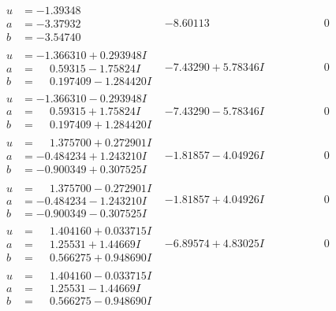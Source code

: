 \documentclass[1p]{elsarticle_modified}
\theoremstyle{definition}
\begin{document}
$$\begin{array}{c|c|c}
\begin{aligned}
u &= -1.39348\phantom{ +0.000000I} \\
a &= -3.37932\phantom{ +0.000000I} \\
b &= -3.54740\phantom{ +0.000000I}\end{aligned}
 & -8.60113\phantom{ +0.000000I} & \phantom{-0.000000 } 0 \\ \hline\begin{aligned}
u &= -1.366310 + 0.293948 I \\
a &= \phantom{-}0.59315 - 1.75824 I \\
b &= \phantom{-}0.197409 - 1.284420 I\end{aligned}
 & -7.43290 + 5.78346 I & \phantom{-0.000000 } 0 \\ \hline\begin{aligned}
u &= -1.366310 - 0.293948 I \\
a &= \phantom{-}0.59315 + 1.75824 I \\
b &= \phantom{-}0.197409 + 1.284420 I\end{aligned}
 & -7.43290 - 5.78346 I & \phantom{-0.000000 } 0 \\ \hline\begin{aligned}
u &= \phantom{-}1.375700 + 0.272901 I \\
a &= -0.484234 + 1.243210 I \\
b &= -0.900349 + 0.307525 I\end{aligned}
 & -1.81857 - 4.04926 I & \phantom{-0.000000 } 0 \\ \hline\begin{aligned}
u &= \phantom{-}1.375700 - 0.272901 I \\
a &= -0.484234 - 1.243210 I \\
b &= -0.900349 - 0.307525 I\end{aligned}
 & -1.81857 + 4.04926 I & \phantom{-0.000000 } 0 \\ \hline\begin{aligned}
u &= \phantom{-}1.404160 + 0.033715 I \\
a &= \phantom{-}1.25531 + 1.44669 I \\
b &= \phantom{-}0.566275 + 0.948690 I\end{aligned}
 & -6.89574 + 4.83025 I & \phantom{-0.000000 } 0 \\ \hline\begin{aligned}
u &= \phantom{-}1.404160 - 0.033715 I \\
a &= \phantom{-}1.25531 - 1.44669 I \\
b &= \phantom{-}0.566275 - 0.948690 I\end{aligned}

\end{array}$$
\end{document}

